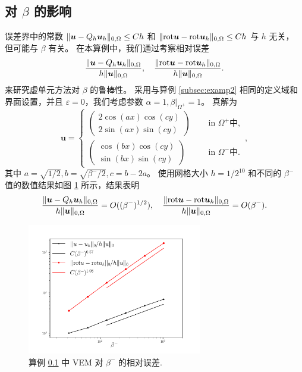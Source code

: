 \subsection{对 $\beta$ 的影响}
\label{subsec:exampwave}

误差界中的常数 $\|\boldsymbol{u} - Q_h \boldsymbol{u}_h\|_{0,\Omega} \leq Ch$ 和
$\|\mathrm{rot} \boldsymbol{u} - \mathrm{rot} \boldsymbol{u}_h\|_{0,\Omega} \leq Ch$ 与 $h$ 无关，
但可能与 $\beta$ 有关。
在本算例中，我们通过考察相对误差
$$
\frac{\|\boldsymbol{u} - Q_h \boldsymbol{u}_h\|_{0,\Omega}}{h\|\boldsymbol{u}\|_{0,\Omega}},
\quad
\frac{\|\mathrm{rot} \boldsymbol{u} - \mathrm{rot} \boldsymbol{u}_h\|_{0,\Omega}}{h\|\boldsymbol{u}\|_{0,\Omega}}.
$$
来研究虚单元方法对 $\beta$ 的鲁棒性。
采用与算例 \ref{subsec:examp2} 相同的定义域和界面设置，并且
$\varepsilon = 0$，我们考虑参数 $\alpha = 1, \beta|_{\Omega^+} = 1$。
真解为
$$
\mathbf{u} = \left\{
\begin{aligned}
\begin{pmatrix}
2\cos(ax)\cos(cy) \\
2\sin(ax)\sin(cy)
\end{pmatrix} \quad &\text{ in } \Omega^{+} 中, \\
\begin{pmatrix}
\cos(bx)\cos(cy) \\
\sin(bx)\sin(cy)
\end{pmatrix} \quad &\text{ in } \Omega^{-} 中.
\end{aligned}
\right.,
$$
其中 $a = \sqrt{1/2}, b = \sqrt{\beta^-/2}, c = b-2a$。
使用网格大小 $h = 1/2^{10}$ 和不同的 $\beta^-$ 值的数值结果如图
\ref{fig:beta_convergence} 所示，结果表明
$$
\frac{\|\boldsymbol{u} - Q_h \boldsymbol{u}_h\|_{0,\Omega}}{h\|\boldsymbol{u}\|_{0,\Omega}} = O((\beta^-)^{1/2}),
\quad
\frac{\|\mathrm{rot} \boldsymbol{u} - \mathrm{rot} \boldsymbol{u}_h\|_{0,\Omega}}{h\|\boldsymbol{u}\|_{0,\Omega}} =
O(\beta^-).
$$
\begin{figure}[h]
\centering
\includegraphics[width=3in]{./figures/maxwell/error_with_different_beta.pdf}
\caption{算例 \ref{subsec:exampwave} 中 VEM 对 $\beta^-$ 的相对误差.}
\label{fig:beta_convergence} %
\end{figure}

